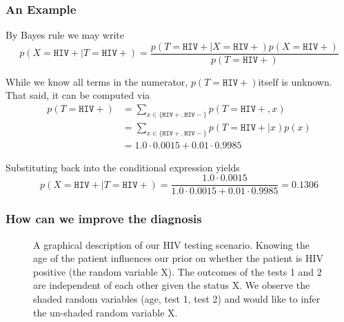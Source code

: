 \documentclass[notheorems, aspectratio=54]{beamer}
\begin{document}
		\begin{frame}
			\frametitle{An Example}
			
			By Bayes rule we may write
			$$
			p(X = \mathtt{HIV+}|T=\mathtt{HIV+}) = \frac{p(T=\mathtt{HIV+}|X=\mathtt{HIV+})p(X=\mathtt{HIV+})}{p(T=\mathtt{HIV+})}
			$$
			
			While we know all terms in the numerator, $p(T = \mathtt{HIV+})$itself is unknown. That said, it can be computed via
			\begin{align}
				\nonumber p(T=\mathtt{HIV+}) &= \sum_{x \in \{\mathtt{HIV+}, \mathtt{HIV-}\}}p(T=\mathtt{HIV+},x) \\
				\nonumber &= \sum_{x \in \{\mathtt{HIV+}, \mathtt{HIV-}\}}p(T=\mathtt{HIV+}|x)p(x) \\
				\nonumber &= 1.0 \cdot 0.0015 + 0.01 \cdot 0.9985
			\end{align}
			
			Substituting back into the conditional expression yields
			$$
			p(X = \mathtt{HIV+}|T=\mathtt{HIV+}) = \frac{1.0 \cdot 0.0015}{1.0 \cdot 0.0015 + 0.01 \cdot 0.9985} = 0.1306
			$$
			
		\end{frame}
		
		
		\begin{frame}
			\frametitle{How can we improve the diagnosis}
			
			
			\center
			
			\begin{figure}
				\caption{A graphical description of our HIV testing scenario. Knowing the age of the patient influences our prior on whether the patient is HIV positive (the random variable X). The outcomes of the tests 1 and 2 are independent of each other given the status X. We observe the shaded random variables (age, test 1, test 2) and would like to infer the un-shaded random variable X.}
			\end{figure}
			
		\end{frame}
		
\end{document}
